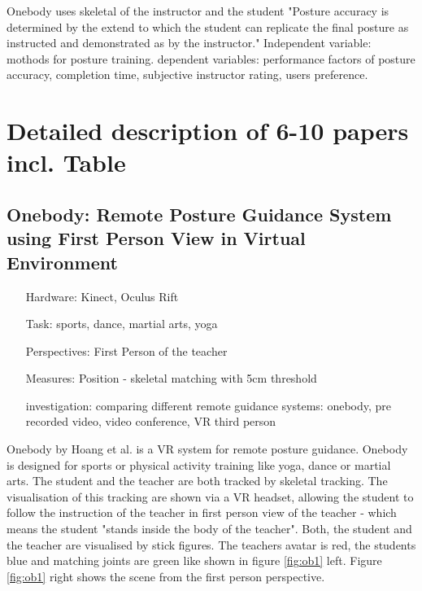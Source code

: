 Onebody \todo uses skeletal of the instructor and the student
"Posture accuracy is determined by the extend to which the student can replicate the final posture as instructed and demonstrated as by the instructor." Independent variable: mothods for posture training. dependent variables: performance factors of posture accuracy, completion time, subjective instructor rating, users preference.


\section{Detailed description of 6-10 papers incl. Table}
\subsection{Onebody: Remote Posture Guidance System using First Person View in Virtual Environment}
\begin{itemize}
	\item[Hardware:] Kinect, Oculus Rift
	\item[Task:] sports, dance, martial arts, yoga
	\item[Perspectives:] First Person of the teacher
	\item[Measures:] Position - skeletal matching with 5cm threshold
	\item[investigation:] comparing different remote guidance systems: onebody, pre recorded video, video conference, VR third person
\end{itemize}
Onebody by Hoang et al. \todo is a VR system for remote posture guidance. Onebody is designed for sports or physical activity training like yoga, dance or martial arts. The student and the teacher are both tracked by skeletal tracking. The visualisation of this tracking are shown via a VR headset, allowing the student to follow the instruction of the teacher in first person view of the teacher - which means the student "stands inside the body of the teacher". Both, the student and the teacher are visualised by stick figures. The teachers avatar is red, the students blue and matching joints are green like shown in figure \ref{fig:ob1} left. Figure \ref{fig:ob1} right shows the scene from the first person perspective.
